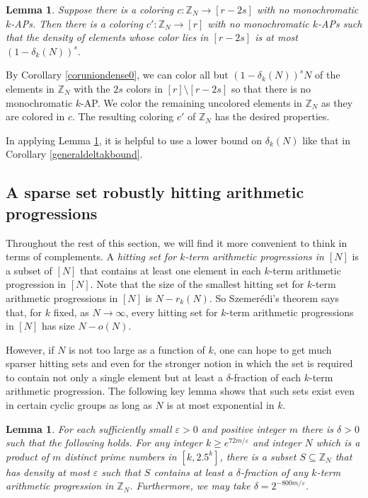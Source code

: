 \documentclass[11pt]{article}
\makeatletter
\numberwithin{equation}{section}
\renewenvironment{proof}[1][\proofname]{\par
  \vspace{-\topsep}%
  \pushQED{\qed}%
  \normalfont
  \topsep0pt \partopsep0pt %
  \trivlist
  \item[\hskip\labelsep
        \itshape
    #1\@addpunct{.}]\ignorespaces
}{%
  \popQED\endtrivlist\@endpefalse
  \addvspace{6pt plus 6pt} %
}
\newtheorem{lem}[result]{Lemma}
\theoremstyle{definition}
\theoremstyle{remark}
\makeatother
\begin{document}
\begin{lem}\label{addscolors general}
    Suppose there is a coloring $c:\mathbb{Z}_N \rightarrow [r-2s]$ with no monochromatic $k$-APs. Then there is a coloring $c':\mathbb{Z}_N \rightarrow [r]$ with no monochromatic $k$-APs such that the density of elements whose color lies in $[r-2s]$ is at most $(1-\delta_k(N))^{s}$. 
\end{lem}
\begin{proof} By Corollary \ref{coruniondense0}, we can color all but $(1-\delta_k(N))^{s}N$ of the elements in $\mathbb{Z}_N$ with the $2s$ colors in $[r]\setminus [r-2s]$ so that there is no monochromatic $k$-AP. We color the remaining uncolored elements in $\mathbb{Z}_N$ as they are colored in $c$. The resulting coloring $c'$ of $\mathbb{Z}_N$ has the desired properties.
\end{proof}

In applying Lemma \ref{addscolors general}, it is helpful to use a lower bound on $\delta_k(N)$ like that in Corollary \ref{generaldeltakbound}.


\subsection{A sparse set robustly hitting arithmetic progressions} 

Throughout the rest of this section, we will find it more convenient to think in terms of complements. A {\it hitting set for $k$-term arithmetic progressions in $[N]$} is a subset of $[N]$ that contains at least one element in each $k$-term arithmetic progression in $[N]$. Note that the size of the smallest hitting set for $k$-term arithmetic progressions in $[N]$ is $N-r_k(N)$. So Szemer\'edi's theorem \cite{Szemeredi} says that, for $k$ fixed, as $N \to \infty$, every hitting set for $k$-term arithmetic progressions in $[N]$ has size $N-o(N)$. 

However, if $N$ is not too large as a function of $k$, one can hope to get much sparser hitting sets and even for the stronger notion in which the set is required to contain not only a single element but at least a $\delta$-fraction of each $k$-term arithmetic progression. The following key lemma shows that such sets exist even in certain cyclic groups as long as $N$ is at most exponential in $k$. 


\begin{lem}\label{cyclicdense}
For each sufficiently small $\varepsilon>0$ and positive integer $m$ there is $\delta>0$ such that the following holds. For any integer $k \geq e^{72m/\varepsilon}$ and integer $N$ which is a product of $m$ distinct prime numbers in $[k,2.5^{k}]$, there is a subset $S \subseteq \mathbb{Z}_N$ that has density at most $\varepsilon$ such that $S$ contains at least a $\delta$-fraction of any $k$-term arithmetic progression in $\mathbb{Z}_N$. Furthermore, we may take $\delta=2^{-800m/\varepsilon}$. 
\end{lem}
\end{document}
